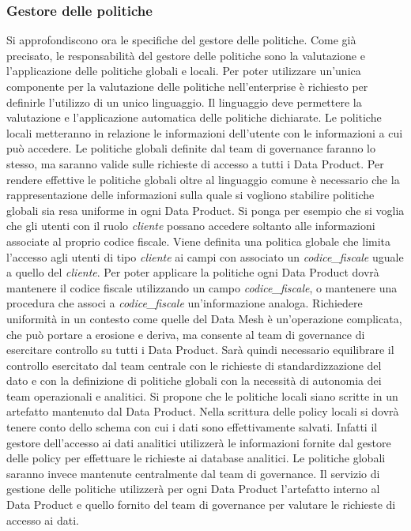 \documentclass[a4paper,12pt]{report}
\begin{document}
\subsubsection{Gestore delle politiche}
Si approfondiscono ora le specifiche del gestore delle politiche.
Come già precisato, le responsabilità del gestore delle politiche sono la valutazione e l'applicazione delle politiche globali e locali.
Per poter utilizzare un'unica componente per la valutazione delle politiche nell'enterprise è richiesto per definirle l'utilizzo di un unico linguaggio. 
Il linguaggio deve permettere la valutazione e l'applicazione automatica delle politiche dichiarate.
Le politiche locali metteranno in relazione le informazioni dell'utente con le informazioni a cui può accedere.
Le politiche globali definite dal team di governance faranno lo stesso, ma saranno valide sulle richieste di accesso a tutti i Data Product.
Per rendere effettive le politiche globali oltre al linguaggio comune è necessario che la rappresentazione delle informazioni sulla quale si vogliono stabilire politiche globali sia resa uniforme in ogni Data Product.
Si ponga per esempio che si voglia che gli utenti con il ruolo \textit{cliente} possano accedere soltanto alle informazioni associate al proprio codice fiscale.
Viene definita una politica globale che limita l'accesso agli utenti di tipo \textit{cliente} ai campi con associato un \textit{codice\_fiscale} uguale a quello del \textit{cliente}.
Per poter applicare la politiche ogni Data Product dovrà mantenere il codice fiscale utilizzando un campo \textit{codice\_fiscale}, o mantenere una procedura che associ  a \textit{codice\_fiscale} un'informazione analoga.
Richiedere uniformità in un contesto come quelle del Data Mesh è un'operazione complicata, che può portare a erosione e deriva, ma consente al team di governance di esercitare controllo su tutti i Data Product.
Sarà quindi necessario equilibrare il controllo esercitato dal team centrale con le richieste di standardizzazione del dato e con la definizione di politiche globali con la necessità di autonomia dei team operazionali e analitici.
Si propone che le politiche locali siano scritte in un artefatto mantenuto dal Data Product. 
Nella scrittura delle policy locali si dovrà tenere conto dello schema con cui i dati sono effettivamente salvati.
Infatti il gestore dell'accesso ai dati analitici utilizzerà le informazioni fornite dal gestore delle policy per effettuare le richieste ai database analitici.
Le politiche globali saranno invece mantenute centralmente dal team di governance.
Il servizio di gestione delle politiche utilizzerà per ogni Data Product l'artefatto interno al Data Product e quello fornito del team di governance per valutare le richieste di accesso ai dati.
\end{document}
